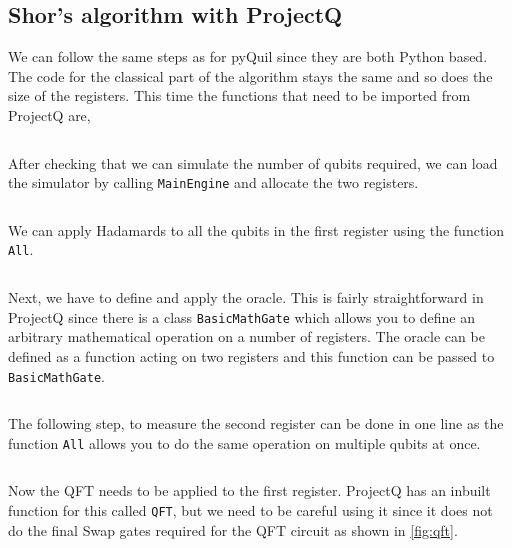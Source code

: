 \subsection{Shor's algorithm with ProjectQ}

We can follow the same steps as for pyQuil since they are both Python based. The code for the classical part of the algorithm stays the same and so does the size of the registers. This time the functions that need to be imported from ProjectQ are,

\inputminted[firstnumber=5, firstline=5, lastline=6]{python}{code/ProjectQ/shor_projectq_guide.txt}

After checking that we can simulate the number of qubits required, we can load the simulator by calling \texttt{MainEngine} and allocate the two registers.

\inputminted[firstnumber=36, firstline=36, lastline=39]{python}{code/ProjectQ/shor_projectq_guide.txt}

We can apply Hadamards to all the qubits in the first register using the function \texttt{All}. 

\inputminted[firstnumber=41, firstline=41, lastline=42]{python}{code/ProjectQ/shor_projectq_guide.txt}

Next, we have to define and apply the oracle. This is fairly straightforward in ProjectQ since there is a class \texttt{BasicMathGate} which allows you to define an arbitrary mathematical operation on a number of registers. The oracle can be defined as a function acting on two registers and this function can be passed to \texttt{BasicMathGate}.

\inputminted[firstnumber=44, firstline=44, lastline=47]{python}{code/ProjectQ/shor_projectq_guide.txt}

The following step, to measure the second register can be done in one line as the function \texttt{All} allows you to do the same operation on multiple qubits at once.

\inputminted[firstnumber=49, firstline=49, lastline=50]{python}{code/ProjectQ/shor_projectq_guide.txt}

Now the QFT needs to be applied to the first register. ProjectQ has an inbuilt function for this called \texttt{QFT}, but we need to be careful using it since it does not do the final Swap gates required for the QFT circuit as shown in \autoref{fig:qft}.

\inputminted[firstnumber=52, firstline=52, lastline=55]{python}{code/ProjectQ/shor_projectq_guide.txt}

